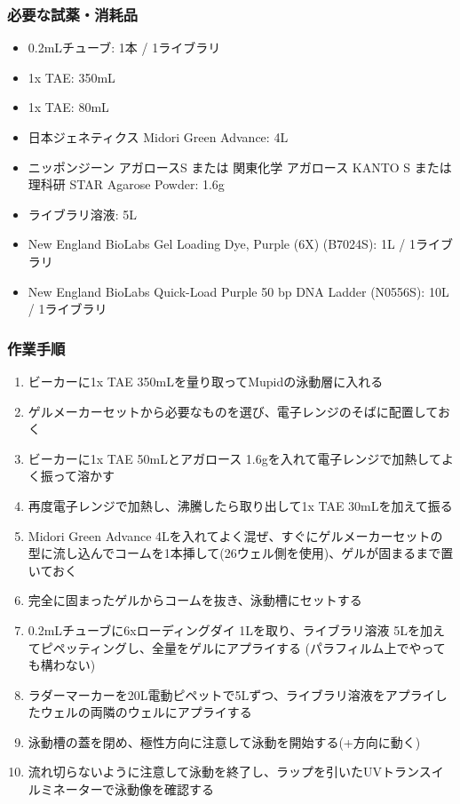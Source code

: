 \documentclass[titlepage,10pt,a4paper,uplatex]{jsbook}
\begin{document}
\subsubsection{必要な試薬・消耗品}
\begin{itemize}
\item 0.2mLチューブ: 1本 / 1ライブラリ
\item 1x TAE: 350mL
\item 1x TAE: 80mL
\item 日本ジェネティクス Midori Green Advance: 4{\textmu}L
\item ニッポンジーン アガロースS または 関東化学 アガロース KANTO S または 理科研 STAR Agarose Powder: 1.6g
\item ライブラリ溶液: 5{\textmu}L
\item New England BioLabs Gel Loading Dye, Purple (6X) (B7024S): 1{\textmu}L / 1ライブラリ
\item New England BioLabs Quick-Load Purple 50 bp DNA Ladder (N0556S): 10{\textmu}L / 1ライブラリ
\end{itemize}

\subsubsection{作業手順}
\begin{enumerate}
\item ビーカーに1x TAE 350mLを量り取ってMupidの泳動層に入れる
\item ゲルメーカーセットから必要なものを選び、電子レンジのそばに配置しておく
\item ビーカーに1x TAE 50mLとアガロース 1.6gを入れて電子レンジで加熱してよく振って溶かす
\item 再度電子レンジで加熱し、沸騰したら取り出して1x TAE 30mLを加えて振る
\item Midori Green Advance 4{\textmu}Lを入れてよく混ぜ、すぐにゲルメーカーセットの型に流し込んでコームを1本挿して(26ウェル側を使用)、ゲルが固まるまで置いておく
\item 完全に固まったゲルからコームを抜き、泳動槽にセットする
\item 0.2mLチューブに6xローディングダイ 1{\textmu}Lを取り、ライブラリ溶液 5{\textmu}Lを加えてピペッティングし、全量をゲルにアプライする (パラフィルム上でやっても構わない)
\item ラダーマーカーを20{\textmu}L電動ピペットで5{\textmu}Lずつ、ライブラリ溶液をアプライしたウェルの両隣のウェルにアプライする
\item 泳動槽の蓋を閉め、極性方向に注意して泳動を開始する(+方向に動く)
\item 流れ切らないように注意して泳動を終了し、ラップを引いたUVトランスイルミネーターで泳動像を確認する
\end{enumerate}
\end{document}
